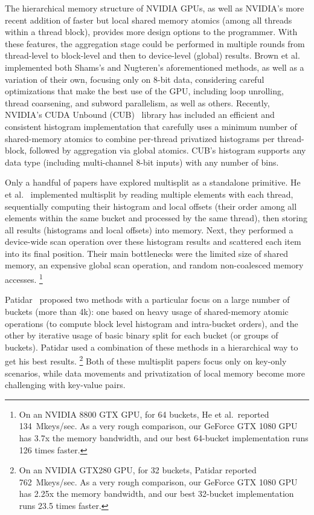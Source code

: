 The hierarchical memory structure of NVIDIA GPUs, as well as NVIDIA's more recent addition of faster but local shared memory atomics (among all threads within a thread block), provides more design options to the programmer.
With these features, the aggregation stage could be performed in multiple rounds from thread-level to block-level and then to device-level (global) results.
Brown et al.~ implemented both Shams's and Nugteren's 
aforementioned methods, as well as a variation of their own, focusing only on 8-bit data, considering careful optimizations that make the best use of the GPU, including loop unrolling, thread coarsening, and subword parallelism, as well as others.
Recently, NVIDIA's CUDA Unbound (CUB)~\cite{Merrill:2015:CUB} library has included an efficient and consistent histogram implementation that carefully uses a minimum number of shared-memory atomics to combine per-thread privatized histograms per thread-block, followed by aggregation via global atomics. CUB's histogram supports any data type (including multi-channel 8-bit inputs) with any number of bins.

Only a handful of papers have explored multisplit as a standalone primitive. He et al.~\cite{He:2008:RJG} implemented multisplit by reading multiple elements with each thread, sequentially computing their histogram and local offsets (their order among all elements within the same bucket and processed by the same thread), then storing all results (histograms and local offsets) into memory. Next, they performed a device-wide scan operation over these histogram results and scattered each item into its final position. Their main bottlenecks were the limited size of shared memory, an expensive global scan operation, and random non-coalesced memory accesses.%
\footnote{On an NVIDIA 8800 GTX GPU, for 64 buckets, He et al.\ reported 134~Mkeys/sec. As a very rough comparison, our GeForce GTX 1080 GPU has 3.7x the memory bandwidth, and our best 64-bucket implementation runs 126 times faster.}

Patidar~\cite{Patidar:2009:SPD} proposed two methods with a particular focus on a large number of buckets (more than 4k): one based on heavy usage of shared-memory atomic operations (to compute block level histogram and intra-bucket orders), and the other by iterative usage of basic binary split for each bucket (or groups of buckets). Patidar used a combination of these methods in a hierarchical way to get his best results.%
\footnote{On an NVIDIA GTX280 GPU, for 32 buckets, Patidar reported 762~Mkeys/sec. As a very rough comparison, our GeForce GTX 1080 GPU has 2.25x the memory bandwidth, and our best 32-bucket implementation runs 23.5 times faster.}
Both of these multisplit papers focus only on key-only scenarios, while data movements and privatization of local memory become more challenging with key-value pairs.
